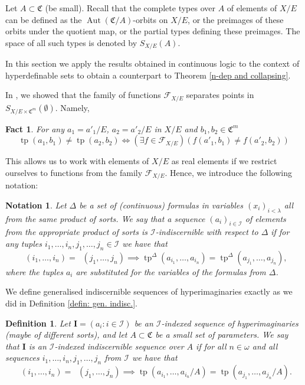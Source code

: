 \documentclass{amsart}
\newtheorem{fact}[teor]{Fact}
\newtheorem{defin}[teor]{Definition}
\newtheorem{notation}{Notation}
\newtheorem{external claim}[teor]{Claim}
\newcommand{\C}{{\mathfrak C}}
\newcommand{\I}{\mathcal{I}}
\newcommand{\II}{\mathbf{I}}
\DeclareMathOperator{\tp}{{tp}}
\DeclareMathOperator{\qftp}{{tp^{qf}}}
\DeclareMathOperator{\aut}{{Aut}}
\begin{document}
Let $A \subset \C$ (be small). Recall that the complete types over $A$ of elements of $X/E$ can be defined as the $\aut(\C/A)$-orbits on $X/E$,  or the preimages of these orbits under the quotient map, or the partial types defining these preimages. The space of all such types is denoted by $S_{X/E}(A)$.

In this section we apply the results obtained in continuous logic to the context of hyperdefinable sets to obtain a counterpart to Theorem \ref{n-dep and collapsing}. 

 In %
 \cite[Proposition 2.1]{10.1215/00294527-2022-0023},
 we showed that the family of functions $\mathcal{F}_{X/E}$ separates points in $S_{X/E\times \C^m}(\emptyset)$. Namely,
\begin{fact}\label{diff type diff f value}
For any $a_1=a'_1/E$, $a_2=a'_2/E$ in $X/E$ and $b_1,b_2\in \mathfrak{C}^m$ 
		$$\tp(a_1,b_1)\neq \tp(a_2,b_2)\iff (\exists f\in \mathcal{F}_{X/E})(f(a'_1,b_1)\neq f(a'_2,b_2)) $$
\end{fact}
This allows us to work with elements of $X/E$ as real elements if we restrict ourselves to functions from the family $\mathcal{F}_{X/E}$. Hence, we introduce the following notation:

\begin{notation} Let $\Delta$ be a set of (continuous) formulas in variables $(x_i)_{i<\lambda}$ all from the same product of sorts. We say that a sequence $(a_i)_{i\in \I}$ of elements from the appropriate product of sorts is $\I$-indiscernible with respect to $\Delta$ if for any tuples $i_1,\dots,i_n,j_1,\dots,j_n\in \I$ we have that %
    $$\qftp(i_1,\dots,i_n)=\qftp(j_1,\dots,j_n) \implies \tp^\Delta(a_{i_1}, \dots, a_{i_n})=\tp^\Delta(a_{j_1}, \dots, a_{j_n}),$$
    where the tuples $a_i$ are substituted for the variables of the formulas from $\Delta$.
\end{notation}

We define generalised indiscernible sequences of hyperimaginaries exactly as we did in Definition \ref{defin: gen. indisc.}.
\begin{defin}%
    Let $\II=(a_i: i\in \I)$ be an $\I$-indexed sequence of hyperimaginaries (maybe of different sorts), and let $A\subset \C$ be a small set of parameters.  We say that $\II$ is an $\I$-\emph{indexed indiscernible sequence over} $A$ if for all $n\in\omega$ and all sequences $i_1,\dots,i_n,j_1,\dots,j_n$ from $\I$ we have that 
    $$\qftp(i_1,\dots,i_n)=\qftp(j_1,\dots,j_n) \implies \tp({a}_{i_1}, \dots, {a}_{i_n}/A)=\tp({a}_{j_1}, \dots, {a}_{j_n}/A).$$
\end{defin}
\end{document}
